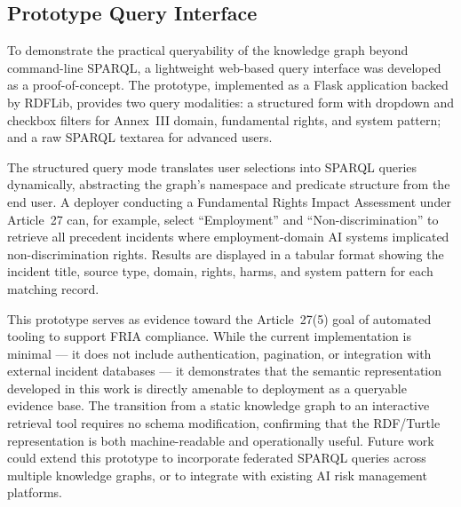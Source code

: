 \subsection{Prototype Query Interface}
\label{subsec:flask-prototype}

To demonstrate the practical queryability of the knowledge graph beyond
command-line SPARQL, a lightweight web-based query interface was developed
as a proof-of-concept. The prototype, implemented as a Flask application
backed by RDFLib, provides two query modalities: a structured form with
dropdown and checkbox filters for Annex~III domain, fundamental rights,
and system pattern; and a raw SPARQL textarea for advanced users.

The structured query mode translates user selections into SPARQL queries
dynamically, abstracting the graph's namespace and predicate structure
from the end user. A deployer conducting a Fundamental Rights Impact
Assessment under Article~27 can, for example, select ``Employment'' and
``Non-discrimination'' to retrieve all precedent incidents where
employment-domain AI systems implicated non-discrimination rights. Results
are displayed in a tabular format showing the incident title, source type,
domain, rights, harms, and system pattern for each matching record.

This prototype serves as evidence toward the Article~27(5) goal of
automated tooling to support FRIA compliance. While the current
implementation is minimal --- it does not include authentication, pagination,
or integration with external incident databases --- it demonstrates that the
semantic representation developed in this work is directly amenable to
deployment as a queryable evidence base. The transition from a static
knowledge graph to an interactive retrieval tool requires no schema
modification, confirming that the RDF/Turtle representation is both
machine-readable and operationally useful. Future work could extend this
prototype to incorporate federated SPARQL queries across multiple
knowledge graphs, or to integrate with existing AI risk management
platforms.
